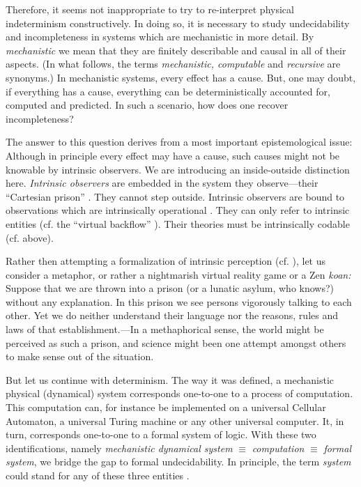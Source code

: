 Therefore, it seems not inappropriate to try to
re-interpret physical indeterminism constructively. In doing so,
it is necessary to study undecidability and incompleteness in systems
which are mechanistic in more detail. By {\em mechanistic} we mean that
they are
finitely describable and causal in all of their aspects. (In what
follows, the terms
{\em mechanistic, computable} and {\em recursive} are synonyms.) In
mechanistic
systems, every effect has a cause. But, one may doubt, if everything
has a cause, everything can be deterministically accounted for, computed
and predicted. In such a scenario,
how does one recover incompleteness?

The answer to this question derives from
a most important epistemological issue:
Although in
principle every effect may have a cause,
such causes might not be knowable by intrinsic observers.
We are introducing an inside-outside distinction here.
 {\em
Intrinsic observers} are embedded in the system they observe---their
``Cartesian prison''
\cite{bos,toffoli:79,sv:83,sv:86,sv:86a,roessler1,roessler2,svozil-93}.
They cannot step outside.
Intrinsic observers are bound to observations which are intrinsically
operational \cite{bridgman}. They can only refer to intrinsic
entities \cite{putnam} (cf. the ``virtual backflow'' \cite{sv:92}).
Their theories must be intrinsically codable (cf. above).

Rather then attempting a formalization of intrinsic perception (cf.
\cite{svozil-93}), let us consider a metaphor, or rather a nightmarish
virtual reality game or a Zen
{\it koan:}
Suppose that we are thrown into a prison (or a lunatic asylum, who
knows?) without any explanation. In this prison we see persons
vigorously talking to each other.
Yet we do neither understand their language nor the reasons, rules and
laws of that establishment.---In a methaphorical sense, the world might
be perceived as such a prison, and science might been one
attempt
amongst others to make sense out of the situation.


But let us continue with determinism.
The way it was defined, a mechanistic physical (dynamical) system
corresponds one-to-one to a process of computation. This computation
can, for instance be
implemented on a universal Cellular Automaton, a universal Turing
machine or any other universal computer. It, in turn, corresponds
one-to-one to
a formal system of logic. With these two identifications, namely
{\em mechanistic dynamical system}
$\equiv$
{\em computation}
$\equiv$
{\em formal system},
we bridge the gap to formal
undecidability. In principle, the term {\em system} could stand
for any of these three entities \cite{svozil-93,rasetti-95}.

